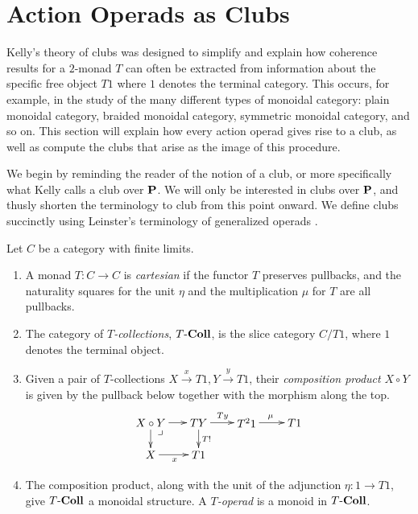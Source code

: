 \section{Action Operads as Clubs}\label{sec:club}

Kelly's theory of clubs \cite{kelly_club1, kelly_club0, kelly_club2} was designed to simplify and explain how coherence results for a $2$-monad $T$ can often be extracted from information about the 
specific free object $T1$ where $1$ denotes the terminal category. This occurs, for example, in the study of the many different types of monoidal category:  plain monoidal category, braided monoidal category, symmetric monoidal category, and so on. This section will explain how every action operad gives rise to a club, as well as compute the clubs that arise as the image of this procedure.

We begin by reminding the reader of the notion of a club, or more specifically what Kelly \cite{kelly_club1,kelly_club2} calls a club over $\mathbf{P}$. We will only be interested in clubs over $\mathbf{P}$, and thusly shorten the terminology to club from this point onward. We define clubs succinctly using Leinster's terminology of generalized operads \cite{leinster}.

\begin{Defi}
Let $C$ be a category with finite limits.
\begin{enumerate}
\item A monad $T \colon C \rightarrow C$ is \textit{cartesian} if the functor $T$ preserves pullbacks, and the naturality squares for the unit $\eta$ and the multiplication $\mu$ for $T$ are all pullbacks.
\item The category of \textit{$T$-collections}, $T\mbox{-}\mathbf{Coll}$, is the slice category $C/T1$, where $1$ denotes the terminal object.
\item Given a pair of $T$-collections $X \stackrel{x}{\rightarrow} T1, Y \stackrel{y}{\rightarrow} T1$, their \textit{composition product} $X \circ Y$ is given by the pullback below together with the morphism along the top.
  \[
    \xy
      (0,0)*+{X \circ Y} ="00";
      (15,0)*+{TY} ="10";
      (30,0)*+{T^{2}1} ="20";
      (45,0)*+{T1} ="30";
      (0,-10)*+{X} ="01";
      (15,-10)*+{T1} ="11";
      {\ar^{} "00" ; "10"};
      {\ar^{Ty} "10" ; "20"};
      {\ar^{\mu} "20" ; "30"};
      {\ar^{T!} "10" ; "11"};
      {\ar_{x} "01" ; "11"};
      {\ar^{} "00" ; "01"};
      (3,-3)*{\lrcorner};
    \endxy
  \]
\item The composition product, along with the unit of the adjunction $\eta \colon 1 \rightarrow T1$, give $T\mbox{-}\mathbf{Coll}$ a monoidal structure. A \textit{$T$-operad} is a monoid in $T\mbox{-}\mathbf{Coll}$.
\end{enumerate}
\end{Defi}

